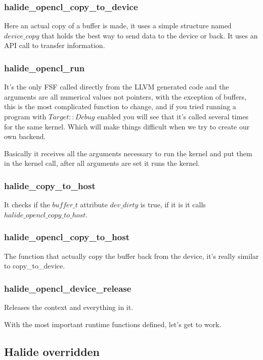 \documentclass[11pt, a4paper]{article}
\begin{document}
\subsubsection{halide\_opencl\_copy\_to\_device}

Here an actual copy of a buffer is made, it uses a simple structure named 
$device\_copy$ that holds the best way to send data to the device or back.
It uses an API call to transfer information. 

\subsubsection{halide\_opencl\_run}

It's the only FSF called directly from the LLVM generated code and the
arguments are all numerical values not pointers, with the exception of buffers,
this is the most complicated function to change, and if you tried running a
program with $Target::Debug$ enabled you will see that it's called several times
for the same kernel. Which will make things difficult when we try to create
our own backend.

Basically it receives all the arguments necessary to run the kernel and put them
in the kernel call, after all arguments are set it runs the kernel.

\subsubsection{halide\_copy\_to\_host}

It checks if the $buffer\_t$ attribute $dev\_dirty$ is true, if it is it calls 
$halide\_opencl\_copy\_to\_host$. 

\subsubsection{halide\_opencl\_copy\_to\_host} 

The function that actually copy the buffer back from the device, it's really
similar to copy\_to\_device.

\subsubsection{halide\_opencl\_device\_release} 

Releases the context and everything in it.

With the most important runtime functions defined, let's get to work.

\subsection{Halide overridden}
\end{document}

